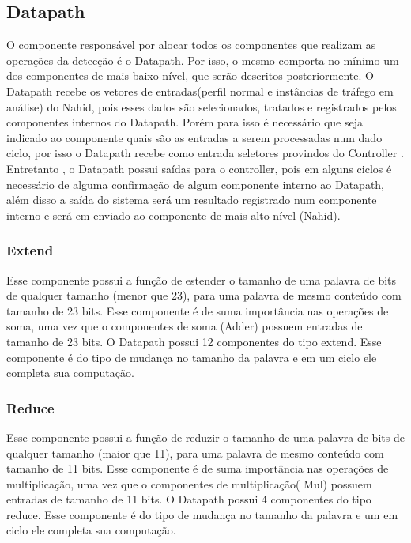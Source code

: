 \subsection{Datapath}

O componente responsável por alocar todos os componentes que realizam as operações da detecção  é o Datapath. Por isso, o mesmo comporta no mínimo um dos componentes de mais baixo nível, que serão descritos posteriormente. O Datapath recebe os vetores de entradas(perfil normal e instâncias de tráfego em análise) do Nahid, pois esses dados são selecionados, tratados e registrados pelos componentes internos do Datapath. Porém para isso é necessário que seja indicado ao componente quais são as entradas a serem processadas num dado ciclo, por isso o Datapath recebe como entrada seletores provindos do Controller . Entretanto , o Datapath possui saídas para o controller, pois em alguns ciclos é necessário de alguma confirmação de algum componente  interno ao Datapath, além disso a saída do sistema será um resultado registrado num componente interno e será em enviado ao componente de mais alto nível (Nahid).
\subsubsection{Extend}
Esse componente possui a função de estender o tamanho de uma palavra de bits de qualquer tamanho (menor que 23), para uma palavra de mesmo conteúdo com tamanho de 23 bits. Esse componente é de suma importância nas operações de soma, uma vez que o componentes de soma (Adder) possuem entradas de tamanho de 23 bits. O Datapath possui 12 componentes do tipo extend. Esse componente é do tipo de mudança no tamanho da palavra e em um ciclo ele completa sua computação.	
\subsubsection{Reduce}
Esse componente possui a função de reduzir o tamanho de uma palavra de bits de qualquer tamanho (maior que 11), para uma palavra de mesmo conteúdo com tamanho de 11 bits. Esse componente é de suma importância nas operações de multiplicação, uma vez que o componentes de multiplicação( Mul) possuem entradas de tamanho de 11 bits. O Datapath possui 4 componentes do tipo reduce. Esse componente é do tipo de mudança no tamanho da palavra e um em ciclo ele completa sua computação.	
